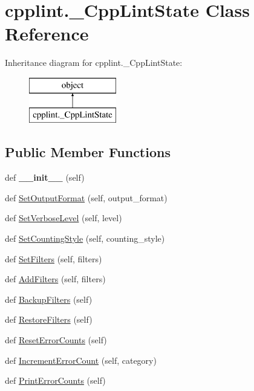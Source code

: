 \hypertarget{classcpplint_1_1__CppLintState}{}\section{cpplint.\+\_\+\+Cpp\+Lint\+State Class Reference}
\label{classcpplint_1_1__CppLintState}
Inheritance diagram for cpplint.\+\_\+\+Cpp\+Lint\+State\+:\begin{figure}[H]
\begin{center}
\leavevmode
\includegraphics[height=2.000000cm]{classcpplint_1_1__CppLintState}
\end{center}
\end{figure}
\subsection*{Public Member Functions}
\begin{DoxyCompactItemize}
\item 
def {\bfseries \+\_\+\+\_\+init\+\_\+\+\_\+} (self)\hypertarget{classcpplint_1_1__CppLintState_a9cc2db6b8d2e3b757fc48fb3c2fd4d8b}{}\label{classcpplint_1_1__CppLintState_a9cc2db6b8d2e3b757fc48fb3c2fd4d8b}

\item 
def \hyperlink{classcpplint_1_1__CppLintState_ab43553d2e2027b58d08a7001c71c0902}{Set\+Output\+Format} (self, output\+\_\+format)
\item 
def \hyperlink{classcpplint_1_1__CppLintState_ad4f97c907cc79e8d60237d0327830588}{Set\+Verbose\+Level} (self, level)
\item 
def \hyperlink{classcpplint_1_1__CppLintState_ac2503f2d8a357edd3ca648d219c7317e}{Set\+Counting\+Style} (self, counting\+\_\+style)
\item 
def \hyperlink{classcpplint_1_1__CppLintState_a359d4516eac0c1dce6223cf18181ac80}{Set\+Filters} (self, filters)
\item 
def \hyperlink{classcpplint_1_1__CppLintState_a248c70895572f2468d3c842faff2f285}{Add\+Filters} (self, filters)
\item 
def \hyperlink{classcpplint_1_1__CppLintState_a2444e784910e03681de22f43d4077dd1}{Backup\+Filters} (self)
\item 
def \hyperlink{classcpplint_1_1__CppLintState_a7a9c9fdfe033ebe1933450b4ae524598}{Restore\+Filters} (self)
\item 
def \hyperlink{classcpplint_1_1__CppLintState_ab802596abd5fba5e290e090388b6842a}{Reset\+Error\+Counts} (self)
\item 
def \hyperlink{classcpplint_1_1__CppLintState_a27a33a5049850d52cc8aef3478ca445a}{Increment\+Error\+Count} (self, category)
\item 
def \hyperlink{classcpplint_1_1__CppLintState_a3149156b00f8d53e5625256e3df2b4f0}{Print\+Error\+Counts} (self)
\end{DoxyCompactItemize}
